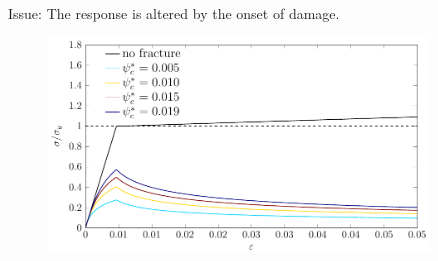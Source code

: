 \begin{frame}
\begin{overlayarea}{\textwidth}{0.4\textwidth}
{\begin{columns}
\begin{column}{0.6\textwidth}
\begin{columns}
\begin{column}[t]{0.5\textwidth}
              Issue: The response is altered by the onset of damage.
              \begin{figure}
                \centering
                \includegraphics[width=0.9\textwidth]{theory/figures/Chapter5-homogenized-compare_alpha-EPPD_xi_0}
              \end{figure}
            \end{column}
          \end{columns}
        \end{column}
      \end{columns}
    }
    
\end{overlayarea}
\end{frame}
